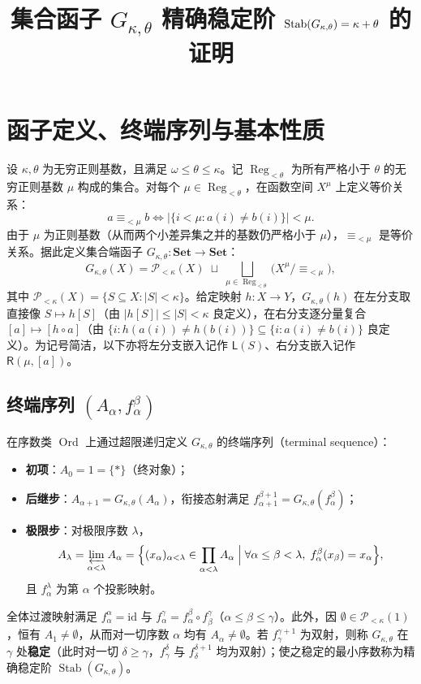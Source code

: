 \documentclass[11pt,a4paper]{ctexart}
\title{集合函子 $G_{\kappa,\theta}$ 精确稳定阶 $\Stab(G_{\kappa,\theta}) = \kappa + \theta$ 的证明}
\date{}
\theoremstyle{definition}
\theoremstyle{plain}
\newcommand{\Stab}{\operatorname{Stab}}
\newcommand{\Reg}{\operatorname{Reg}}
\newcommand{\Ord}{\operatorname{Ord}}
\newcommand{\id}{\mathrm{id}}
\newcommand{\Set}{\mathbf{Set}}
\begin{document}
\maketitle

\section{函子定义、终端序列与基本性质}

设 $\kappa, \theta$ 为无穷正则基数，且满足 $\omega \le \theta \le \kappa$。记 $\Reg_{<\theta}$ 为所有严格小于 $\theta$ 的无穷正则基数 $\mu$ 构成的集合。对每个 $\mu \in \Reg_{<\theta}$，在函数空间 $X^\mu$ 上定义等价关系：
\[
  a \equiv_{<\mu} b \iff \bigl|\{ i < \mu : a(i) \neq b(i) \}\bigr| < \mu.
\]
由于 $\mu$ 为正则基数（从而两个小差异集之并的基数仍严格小于 $\mu$），$\equiv_{<\mu}$ 是等价关系。据此定义集合端函子 $G_{\kappa,\theta} : \Set \to \Set$：
\[
  G_{\kappa,\theta}(X) = \mathcal{P}_{<\kappa}(X) \;\sqcup\; \bigsqcup_{\mu \in \Reg_{<\theta}} \bigl(X^\mu / {\equiv_{<\mu}}\bigr),
\]
其中 $\mathcal{P}_{<\kappa}(X) = \{ S \subseteq X : |S| < \kappa \}$。给定映射 $h : X \to Y$，$G_{\kappa,\theta}(h)$ 在左分支取直接像 $S \mapsto h[S]$（由 $|h[S]| \le |S| < \kappa$ 良定义），在右分支逐分量复合 $[a] \mapsto [h \circ a]$（由 $\{ i : h(a(i)) \neq h(b(i)) \} \subseteq \{ i : a(i) \neq b(i) \}$ 良定义）。为记号简洁，以下亦将左分支嵌入记作 $\mathsf{L}(S)$、右分支嵌入记作 $\mathsf{R}(\mu, [a])$。

\subsection*{终端序列 $(A_\alpha, f_\alpha^\beta)$}

在序数类 $\Ord$ 上通过超限递归定义 $G_{\kappa,\theta}$ 的终端序列（terminal sequence）：
\begin{itemize}[leftmargin=2em]
  \item \textbf{初项}：$A_0 = 1 = \{*\}$（终对象）；
  \item \textbf{后继步}：$A_{\alpha+1} = G_{\kappa,\theta}(A_\alpha)$，衔接态射满足 $f_{\alpha+1}^{\beta+1} = G_{\kappa,\theta}(f_\alpha^\beta)$；
  \item \textbf{极限步}：对极限序数 $\lambda$，
    \[
      A_\lambda = \varprojlim_{\alpha < \lambda} A_\alpha = \Bigl\{ (x_\alpha)_{\alpha < \lambda} \in \prod_{\alpha<\lambda} A_\alpha \;\Big|\; \forall \alpha \le \beta < \lambda,\; f_\alpha^\beta(x_\beta) = x_\alpha \Bigr\},
    \]
    且 $f_\alpha^\lambda$ 为第 $\alpha$ 个投影映射。
\end{itemize}
全体过渡映射满足 $f_\alpha^\alpha = \id$ 与 $f_\alpha^\gamma = f_\alpha^\beta \circ f_\beta^\gamma$（$\alpha \le \beta \le \gamma$）。此外，因 $\emptyset \in \mathcal{P}_{<\kappa}(1)$，恒有 $A_1 \neq \emptyset$，从而对一切序数 $\alpha$ 均有 $A_\alpha \neq \emptyset$。若 $f_\gamma^{\gamma+1}$ 为双射，则称 $G_{\kappa,\theta}$ 在 $\gamma$ 处\textbf{稳定}（此时对一切 $\delta \ge \gamma$，$f_\gamma^\delta$ 与 $f_\delta^{\delta+1}$ 均为双射）；使之稳定的最小序数称为精确稳定阶 $\Stab(G_{\kappa,\theta})$。
\end{document}
